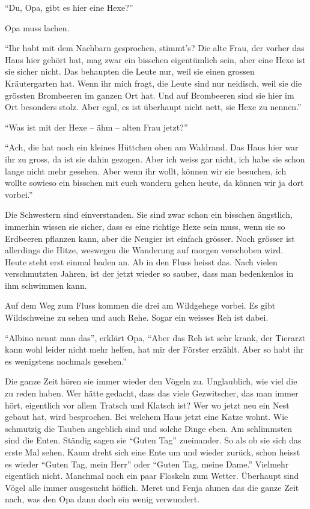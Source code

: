 \enquote{Du, Opa, gibt es hier eine Hexe?}

Opa muss lachen.

\enquote{Ihr habt mit dem Nachbarn gesprochen, stimmt's? Die alte Frau, der
vorher das Haus hier gehört hat, mag zwar ein bisschen eigentümlich sein, aber
eine Hexe ist sie sicher nicht. Das behaupten die Leute nur, weil sie einen
grossen Kräutergarten hat. Wenn ihr mich fragt, die Leute sind nur neidisch,
weil sie die grössten Brombeeren im ganzen Ort hat. Und auf Brombeeren sind sie
hier im Ort besonders stolz. Aber egal, es ist überhaupt nicht nett, sie Hexe zu nennen.}

\enquote{Was ist mit der Hexe -- ähm -- alten Frau jetzt?}

\enquote{Ach, die hat noch ein kleines Hüttchen oben am Waldrand. Das Haus hier war ihr zu gross, da ist sie dahin gezogen. Aber ich weiss gar nicht, ich habe sie schon lange nicht mehr gesehen. Aber wenn ihr wollt, können wir sie besuchen, ich wollte sowieso ein bisschen mit euch wandern gehen heute, da können wir ja dort vorbei.}

Die Schwestern sind einverstanden. Sie sind zwar schon ein bisschen ängstlich, immerhin wissen sie sicher, dass es eine richtige Hexe sein muss, wenn sie so Erdbeeren pflanzen kann, aber die Neugier ist einfach grösser. Noch grösser ist allerdings die Hitze, weswegen die Wanderung auf morgen verschoben wird. Heute steht erst einmal baden an. Ab in den Fluss heisst das. Nach vielen verschmutzten Jahren, ist der jetzt wieder so sauber, dass man bedenkenlos in ihm schwimmen kann.

Auf dem Weg zum Fluss kommen die drei am Wildgehege vorbei. Es gibt Wildschweine zu sehen und auch Rehe. Sogar ein weisses Reh ist dabei. 

\enquote{Albino nennt man das}, erklärt Opa, \enquote{Aber das Reh ist sehr krank, der Tierarzt kann wohl leider nicht mehr helfen, hat mir der Förster erzählt. Aber so habt ihr es wenigstens nochmals gesehen.}

Die ganze Zeit hören sie immer wieder den Vögeln zu. Unglaublich, wie viel die zu reden haben. Wer hätte gedacht, dass das viele Gezwitscher, das man immer hört, eigentlich vor allem Tratsch und Klatsch ist? Wer wo jetzt neu ein Nest gebaut hat, wird besprochen. Bei welchem Haus jetzt eine Katze wohnt. Wie schmutzig die Tauben angeblich sind und solche Dinge eben. Am schlimmsten sind die Enten. Ständig sagen sie \enquote{Guten Tag} zueinander. So als ob sie sich das erste Mal sehen. Kaum dreht sich eine Ente um und wieder zurück, schon heisst es wieder \enquote{Guten Tag, mein Herr} oder \enquote{Guten Tag, meine Dame.} Vielmehr eigentlich nicht. Manchmal noch ein paar Floskeln zum Wetter. Überhaupt sind Vögel alle immer ausgesucht höflich. Meret und Fenja ahmen das die ganze Zeit nach, was den Opa dann doch ein wenig verwundert.

